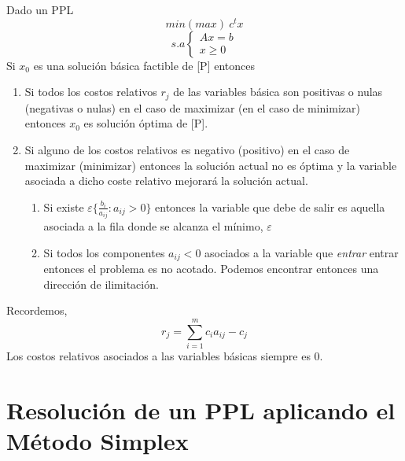 \documentclass[11pt,fleqn]{book} %
\begin{document}
\begin{theorem}
	Dado un PPL 
	$$min (max) ~ c^t x $$
	$$s.a \left\{ \begin{array}{c}
	Ax=b \\
	x\geq 0
	\end{array}\right.$$
	Si $x_0$ es una solución básica factible de [P] entonces
	\begin{enumerate}
		\item Si todos los costos relativos $r_j$ de las variables básica son positivas o nulas (negativas o nulas) en el caso de maximizar (en el caso de minimizar) entonces $x_0$ es solución óptima de [P].
		\item Si alguno de los costos relativos es negativo (positivo) en el caso de maximizar (minimizar) entonces la solución actual no es óptima y la variable asociada a dicho coste relativo mejorará la solución actual.
		\begin{enumerate}
			\item Si existe $\varepsilon\{\frac{b_i}{a_{ij}} : a_{ij} >0 \}$ entonces la variable que debe de salir es aquella asociada a la fila donde se alcanza el mínimo, $\varepsilon$
			\item Si todos los componentes $a_{ij}<0$ asociados a la variable que \textit{entrar} entrar entonces el problema es no acotado. Podemos encontrar entonces una dirección de ilimitación.
		\end{enumerate}
	\end{enumerate}
	Recordemos, $$r_j=\sum_{i=1}^{m}c_i a_{ij}-c_j$$ 
	Los costos relativos asociados a las variables básicas siempre es $0$.
\end{theorem}

\section{Resolución de un PPL aplicando el Método Simplex}
\end{document}
